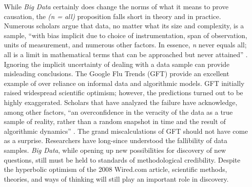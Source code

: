 \documentclass[sigconf]{acmart}
\begin{document}
	While {\em Big Data} certainly does change the norms of what it means to prove causation, the {\em (n = all)}  proposition falls short in theory and in practice. Numerous scholars argue that data, no matter what its size and complexity, is a sample, ``with bias implicit due to choice of instrumentation, span of observation, units of measurement, and numerous other factors. In essence, {\em n} never equals all; all is a limit in mathematical terms that can be approached but never attained'' \cite{Keystone}. Ignoring the implicit uncertainty of dealing with a data sample can provide misleading conclusions. The Google Flu Trends (GFT) provide an excellent example of over reliance on informal data and algorithmic models. GFT initially raised widespread scientific optimism; however, the predictions turned out to be highly exaggerated. Scholars that have analyzed the failure have acknowledge, among other factors, ``an overconfidence in the veracity of the data as a true sample of reality, rather than a random snapshot in time and the result of algorithmic dynamics'' \cite{Keystone}. The grand miscalculations of GFT should not have come as a surprise. Researchers have long-since understood the fallibility of data samples. {\em Big Data}, while opening up new possibilities for discovery of new questions, still must be held to standards of methodological credibility. Despite the hyperbolic optimism of the 2008 Wired.com article, scientific methods, theories, and ways of thinking will still play an important role in discovery.
\end{document}
